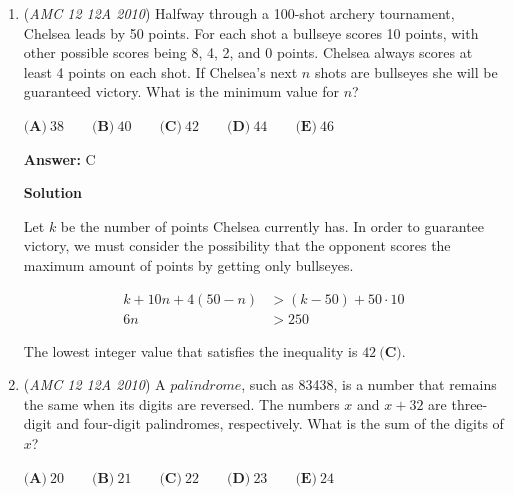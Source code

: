\begin{enumerate}
\textbf{Solution}

$x$ is negative, so we can just place a negative value into each expression and find the one that is positive. Suppose we use $-1$.

 $\textbf{(A)} \Rightarrow \frac{-1}{|-1|} = -1$
$\textbf{(B)} \Rightarrow -(-1)^2 = -1$
$\textbf{(C)} \Rightarrow -2^{(-1)} = -\frac{1}{2}$
$\textbf{(D)} \Rightarrow -(-1)^{(-1)} = 1$
$\textbf{(E)} \Rightarrow \sqrt[3]{-1} = -1$

 
Obviously only $\boxed{\textbf{(D)}}$ is positive.

 


	\item (\textit{AMC 12 12A 2010}) Halfway through a 100-shot archery tournament, Chelsea leads by 50 points. For each shot a bullseye scores 10 points, with other possible scores being 8, 4, 2, and 0 points. Chelsea always scores at least 4 points on each shot. If Chelsea's next $n$ shots are bullseyes she will be guaranteed victory. What is the minimum value for $n$?


 $\textbf{(A)}\ 38 \qquad \textbf{(B)}\ 40 \qquad \textbf{(C)}\ 42 \qquad \textbf{(D)}\ 44 \qquad \textbf{(E)}\ 46$

 \textbf{Answer: }C



\textbf{Solution}

Let $k$ be the number of points Chelsea currently has. In order to guarantee victory, we must consider the possibility that the opponent scores the maximum amount of points by getting only bullseyes.

 
 \begin{align*}k+ 10n + 4(50-n) &> (k-50) + 50\cdot{10}\\  6n &> 250\end{align*}


 
The lowest integer value that satisfies the inequality is $\boxed{42\ \textbf{(C)}}$.

 


	\item (\textit{AMC 12 12A 2010}) A $\textit{palindrome}$, such as 83438, is a number that remains the same when its digits are reversed. The numbers $x$ and $x+32$ are three-digit and four-digit palindromes, respectively. What is the sum of the digits of $x$?


 $\textbf{(A)}\ 20 \qquad \textbf{(B)}\ 21 \qquad \textbf{(C)}\ 22 \qquad \textbf{(D)}\ 23 \qquad \textbf{(E)}\ 24$


\end{enumerate}
